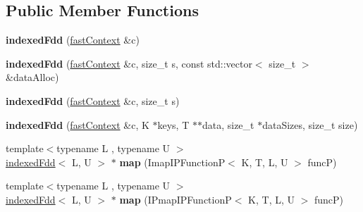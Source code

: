 \subsection*{Public Member Functions}
\begin{DoxyCompactItemize}
\item 
\hypertarget{classfaster_1_1indexedFdd_3_01K_00_01T_01_5_01_4_a87aee6dcc77e70ba4447d8bbc763c407}{}\label{classfaster_1_1indexedFdd_3_01K_00_01T_01_5_01_4_a87aee6dcc77e70ba4447d8bbc763c407} 
{\bfseries indexed\+Fdd} (\hyperlink{classfaster_1_1fastContext}{fast\+Context} \&c)
\item 
\hypertarget{classfaster_1_1indexedFdd_3_01K_00_01T_01_5_01_4_aec3fecef4bfa9f08895ed89045e8462a}{}\label{classfaster_1_1indexedFdd_3_01K_00_01T_01_5_01_4_aec3fecef4bfa9f08895ed89045e8462a} 
{\bfseries indexed\+Fdd} (\hyperlink{classfaster_1_1fastContext}{fast\+Context} \&c, size\+\_\+t s, const std\+::vector$<$ size\+\_\+t $>$ \&data\+Alloc)
\item 
\hypertarget{classfaster_1_1indexedFdd_3_01K_00_01T_01_5_01_4_a36bc7e44015d4d79ed35dbbea6d6ff98}{}\label{classfaster_1_1indexedFdd_3_01K_00_01T_01_5_01_4_a36bc7e44015d4d79ed35dbbea6d6ff98} 
{\bfseries indexed\+Fdd} (\hyperlink{classfaster_1_1fastContext}{fast\+Context} \&c, size\+\_\+t s)
\item 
\hypertarget{classfaster_1_1indexedFdd_3_01K_00_01T_01_5_01_4_a4e9372f28592b79a12659db3c0f0d725}{}\label{classfaster_1_1indexedFdd_3_01K_00_01T_01_5_01_4_a4e9372f28592b79a12659db3c0f0d725} 
{\bfseries indexed\+Fdd} (\hyperlink{classfaster_1_1fastContext}{fast\+Context} \&c, K $\ast$keys, T $\ast$$\ast$data, size\+\_\+t $\ast$data\+Sizes, size\+\_\+t size)
\item 
\hypertarget{classfaster_1_1indexedFdd_3_01K_00_01T_01_5_01_4_ac415b9ac120e7f41daae599b04ed4e9d}{}\label{classfaster_1_1indexedFdd_3_01K_00_01T_01_5_01_4_ac415b9ac120e7f41daae599b04ed4e9d} 
{\footnotesize template$<$typename L , typename U $>$ }\\\hyperlink{classfaster_1_1indexedFdd}{indexed\+Fdd}$<$ L, U $>$ $\ast$ {\bfseries map} (Imap\+I\+P\+FunctionP$<$ K, T, L, U $>$ funcP)
\item 
\hypertarget{classfaster_1_1indexedFdd_3_01K_00_01T_01_5_01_4_a76632c9cc360bc0b0074a5d6d5a33fa9}{}\label{classfaster_1_1indexedFdd_3_01K_00_01T_01_5_01_4_a76632c9cc360bc0b0074a5d6d5a33fa9} 
{\footnotesize template$<$typename L , typename U $>$ }\\\hyperlink{classfaster_1_1indexedFdd}{indexed\+Fdd}$<$ L, U $>$ $\ast$ {\bfseries map} (I\+Pmap\+I\+P\+FunctionP$<$ K, T, L, U $>$ funcP)
$$
\end{DoxyCompactItemize}
